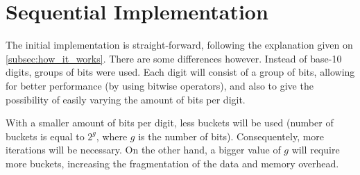 \section{Sequential Implementation}
\label{sec:seq}

The initial implementation is straight-forward, following the explanation given on \autoref{subsec:how_it_works}. There are some differences however. Instead of base-10 digits, groups of bits were used. Each digit will consist of a group of bits, allowing for better performance (by using bitwise operators), and also to give the possibility of easily varying the amount of bits per digit.

With a smaller amount of bits per digit, less buckets will be used (number of buckets is equal to $2^g$, where $g$ is the number of bits). Consequentely, more iterations will be necessary. On the other hand, a bigger value of $g$ will require more buckets, increasing the fragmentation of the data and memory overhead.
